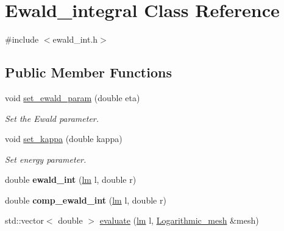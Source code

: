 \hypertarget{classEwald__integral}{}\section{Ewald\+\_\+integral Class Reference}
\label{classEwald__integral}


{\ttfamily \#include $<$ewald\+\_\+int.\+h$>$}

\subsection*{Public Member Functions}
\begin{DoxyCompactItemize}
\item 
\mbox{\label{classEwald__integral_a81b6312a37021cf8e9a45e417a2c3143}} 
void \hyperlink{classEwald__integral_a81b6312a37021cf8e9a45e417a2c3143}{set\+\_\+ewald\+\_\+param} (double eta)
\begin{DoxyCompactList}\small\item\em Set the Ewald parameter. \end{DoxyCompactList}\item 
\mbox{\label{classEwald__integral_a61619cc2dbdb9cada4552128277aa390}} 
void \hyperlink{classEwald__integral_a61619cc2dbdb9cada4552128277aa390}{set\+\_\+kappa} (double kappa)
\begin{DoxyCompactList}\small\item\em Set energy parameter. \end{DoxyCompactList}\item 
\mbox{\label{classEwald__integral_acb4f3774a2b38c549791d89aa2040143}} 
double {\bfseries ewald\+\_\+int} (\hyperlink{structlm}{lm} l, double r)
\item 
\mbox{\label{classEwald__integral_adb1795037f6bfbb41a01f15be2ad27b4}} 
double {\bfseries comp\+\_\+ewald\+\_\+int} (\hyperlink{structlm}{lm} l, double r)
\item 
\mbox{\label{classEwald__integral_ad3f3f659c22073f76bb1262e47e847fd}} 
std\+::vector$<$ double $>$ \hyperlink{classEwald__integral_ad3f3f659c22073f76bb1262e47e847fd}{evaluate} (\hyperlink{structlm}{lm} l, \hyperlink{classLogarithmic__mesh}{Logarithmic\+\_\+mesh} \&mesh)

\end{DoxyCompactItemize}
